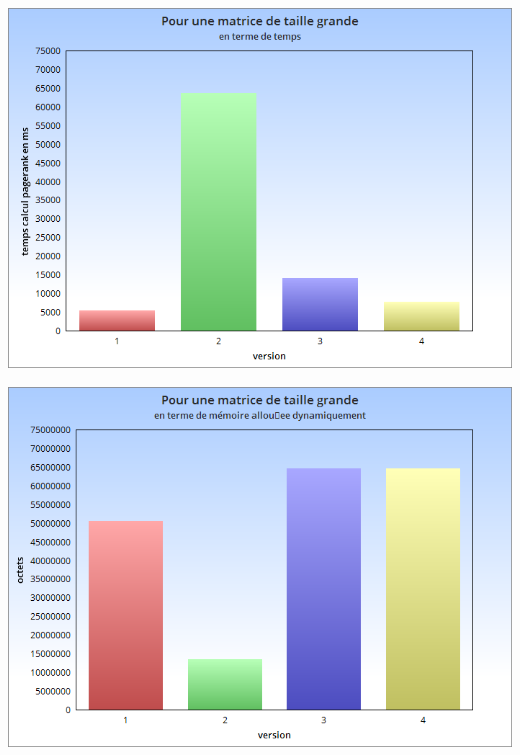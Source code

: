 \documentclass[10pt,a4paper]{article}
\begin{document}
\begin{center}
\includegraphics[scale=0.4]{../histogrammes/matrice_grande_temps.png}
\end{center}
\begin{center}
\includegraphics[scale=0.4]{../histogrammes/matrice_grande_memoire.png}
\end{center}
\end{document}
